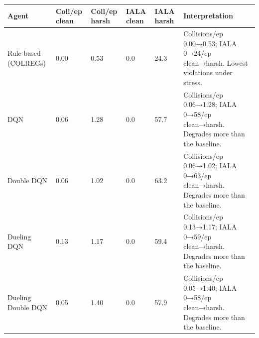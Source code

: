 \begin{tabular}{llllll}
\toprule
Agent & Coll/ep clean & Coll/ep harsh & IALA clean & IALA harsh & Interpretation \\
\midrule
Rule-based (COLREGs) & 0.00 & 0.53 & 0.0 & 24.3 & Collisions/ep 0.00→0.53; IALA 0→24/ep clean→harsh. Lowest violations under stress. \\
DQN & 0.06 & 1.28 & 0.0 & 57.7 & Collisions/ep 0.06→1.28; IALA 0→58/ep clean→harsh. Degrades more than the baseline. \\
Double DQN & 0.06 & 1.02 & 0.0 & 63.2 & Collisions/ep 0.06→1.02; IALA 0→63/ep clean→harsh. Degrades more than the baseline. \\
Dueling DQN & 0.13 & 1.17 & 0.0 & 59.4 & Collisions/ep 0.13→1.17; IALA 0→59/ep clean→harsh. Degrades more than the baseline. \\
Dueling Double DQN & 0.05 & 1.40 & 0.0 & 57.9 & Collisions/ep 0.05→1.40; IALA 0→58/ep clean→harsh. Degrades more than the baseline. \\
\bottomrule
\end{tabular}
